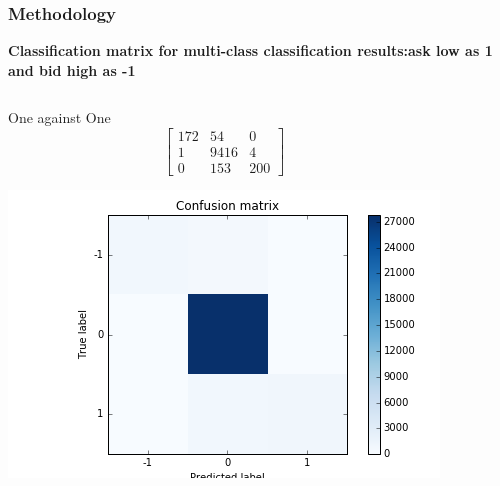 \documentclass[xcolor={x11names,svgnames,dvipsnames}]{beamer}
\begin{document}
\begin{frame}
\frametitle{Methodology}
\textbf{Classification matrix for multi-class classification results:ask low as 1 and bid high as -1}\\
\begin{columns}
\column{2.3in}
	\begin{block}{One against One}
\begin{equation*}       
\left[           
  \begin{array}{ccc}   
    172&    54 &    0\\  
     1& 9416& 4\\  
    0  &  153 & 200
  \end{array}
\right]               
\end{equation*}
\begin{center}
     \includegraphics[width=1\textwidth, height=0.45\textheight]{one_vs_one.png}
\end{center}
\end{block}
\column{2.3in}


\end{columns}
\end{frame}
\end{document}
